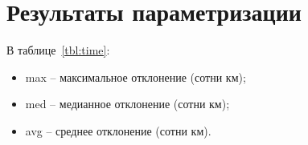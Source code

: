 

\renewcommand{\thetable}{A.\arabic{table}} %


    \setcounter{page}{1}
    \section*{Результаты параметризации}

    \setcounter{table}{0}

%
	В таблице~\ref{tbl:time}:
	\begin{itemize}
		\item max -- максимальное отклонение (сотни км);
		\item med -- медианное отклонение (сотни км);
		\item avg -- среднее отклонение (сотни км).
	\end{itemize}

